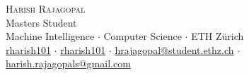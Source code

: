 \newcommand{\sep}{$\cdot$}%
\newcommand{\gmail}{harish.rajagopals@gmail.com}
\newcommand{\ethzmail}{hrajagopal@student.ethz.ch}

\begin{center}

\color{headings}
\textsc{\huge Harish Rajagopal}\\[2mm]
Masters Student\\[1mm]
Machine Intelligence \sep{} Computer Science \sep{} ETH Zürich\\[1mm]
\faGithub{} \href{https://github.com/rharish101}{rharish101} \sep{}
\faLinkedin{} \href{https://www.linkedin.com/in/rharish101/}{rharish101} \sep{}
\faEnvelope{} \href{mailto:\ethzmail}{\ethzmail} \sep{}
\faEnvelope{} \href{mailto:\gmail}{\gmail}

\end{center}
